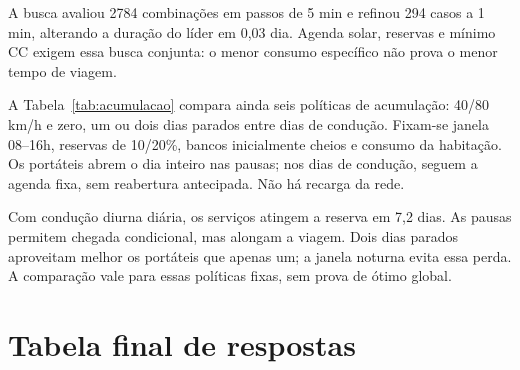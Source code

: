 \documentclass[12pt,a4paper]{article}
\begin{document}
A busca avaliou 2784 combinações em passos de 5 min e refinou 294 casos a 1 min,
alterando a duração do líder em 0,03 dia. Agenda solar, reservas e mínimo CC exigem
essa busca conjunta: o menor consumo específico não prova o menor tempo de viagem.

A Tabela~\ref{tab:acumulacao} compara ainda seis políticas de acumulação: 40/80 km/h
e zero, um ou dois dias parados entre dias de condução. Fixam-se janela 08--16h,
reservas de 10/20\%, bancos inicialmente cheios e consumo da habitação. Os portáteis
abrem o dia inteiro nas pausas; nos dias de condução, seguem a agenda fixa, sem
reabertura antecipada. Não há recarga da rede.

Com condução diurna diária, os serviços atingem a reserva em 7,2 dias.
As pausas permitem chegada condicional, mas alongam a viagem. Dois dias parados
aproveitam melhor os portáteis que apenas um; a janela noturna evita essa perda.
A comparação vale para essas políticas fixas, sem prova de ótimo global.

\FloatBarrier
{}
\section{Tabela final de respostas}
\end{document}

